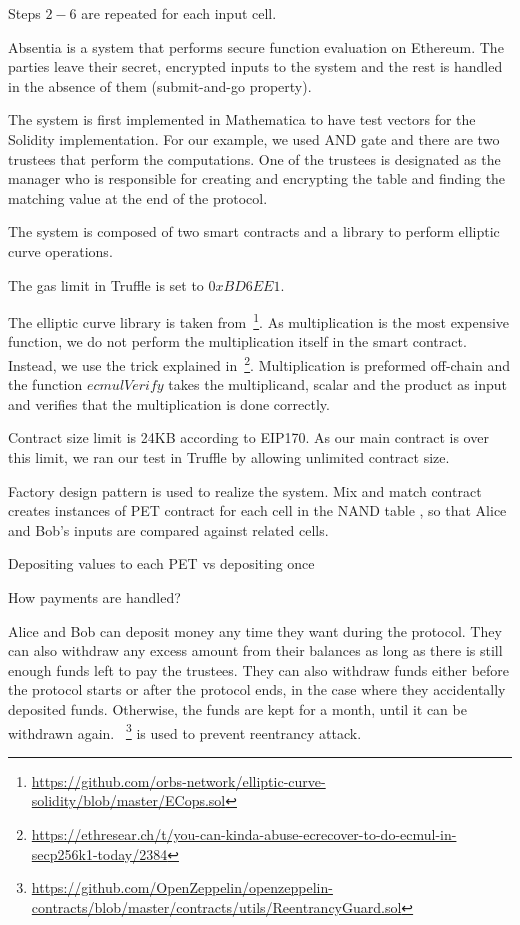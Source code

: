 Steps $2-6$ are repeated for each input cell.

Absentia is a system that performs secure function evaluation on Ethereum. The parties leave their secret, encrypted inputs to the system and the rest is handled in the absence of them (submit-and-go property).

The system is first implemented in Mathematica to have test vectors for the Solidity implementation. For our example, we used AND gate and there are two trustees that perform the computations. One of the trustees is designated as the manager who is responsible for creating and encrypting the table and finding the matching value at the end of the protocol.

The system is composed of two smart contracts and a library to perform elliptic curve operations.

The gas limit in Truffle is set to $0xBD6EE1$.

The elliptic curve library is taken from~\footnote{\url{https://github.com/orbs-network/elliptic-curve-solidity/blob/master/ECops.sol}}. As multiplication is the most expensive function, we do not perform the multiplication itself in the smart contract. Instead, we use the trick explained in~\footnote{\url{https://ethresear.ch/t/you-can-kinda-abuse-ecrecover-to-do-ecmul-in-secp256k1-today/2384}}. Multiplication is preformed off-chain and the function $ecmulVerify$ takes the multiplicand, scalar and the product as input and verifies that the multiplication is done correctly.

Contract size limit is 24KB according to EIP170. As our main contract is over this limit, we ran our test in Truffle by allowing unlimited contract size.

Factory design pattern is used to realize the system. Mix and match contract creates instances of PET contract for each cell in the NAND table , so that Alice and Bob's inputs are compared against related cells.

Depositing values to each PET vs depositing once

How payments are handled? 

Alice and Bob can deposit money any time they want during the protocol. They can also withdraw any excess amount from their balances as long as there is still enough funds left to pay the trustees. They can also withdraw funds either before the protocol starts or after the protocol ends, in the case where they accidentally deposited funds. Otherwise, the funds are kept for a month, until it can be withdrawn again. ~\footnote{\url{https://github.com/OpenZeppelin/openzeppelin-contracts/blob/master/contracts/utils/ReentrancyGuard.sol}} is used to prevent reentrancy attack.

